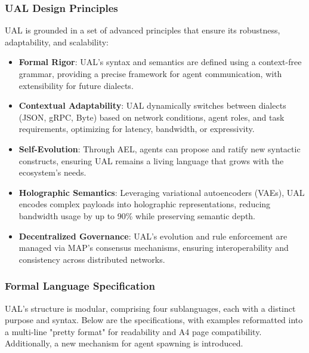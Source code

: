 \documentclass[a4paper,11pt]{article}
\begin{document}
\subsubsection{UAL Design Principles}
UAL is grounded in a set of advanced principles that ensure its robustness, adaptability, and scalability:
\begin{itemize}[leftmargin=*]
    \item \textbf{Formal Rigor}: UAL’s syntax and semantics are defined using a context-free grammar, providing a precise framework for agent communication, with extensibility for future dialects.
    \item \textbf{Contextual Adaptability}: UAL dynamically switches between dialects (JSON, gRPC, Byte) based on network conditions, agent roles, and task requirements, optimizing for latency, bandwidth, or expressivity.
    \item \textbf{Self-Evolution}: Through AEL, agents can propose and ratify new syntactic constructs, ensuring UAL remains a living language that grows with the ecosystem’s needs.
    \item \textbf{Holographic Semantics}: Leveraging variational autoencoders (VAEs), UAL encodes complex payloads into holographic representations, reducing bandwidth usage by up to 90\% while preserving semantic depth.
    \item \textbf{Decentralized Governance}: UAL’s evolution and rule enforcement are managed via MAP’s consensus mechanisms, ensuring interoperability and consistency across distributed networks.
\end{itemize}

\subsubsection{Formal Language Specification}
UAL’s structure is modular, comprising four sublanguages, each with a distinct purpose and syntax. Below are the specifications, with examples reformatted into a multi-line "pretty format" for readability and A4 page compatibility. Additionally, a new mechanism for agent spawning is introduced.
\end{document}
